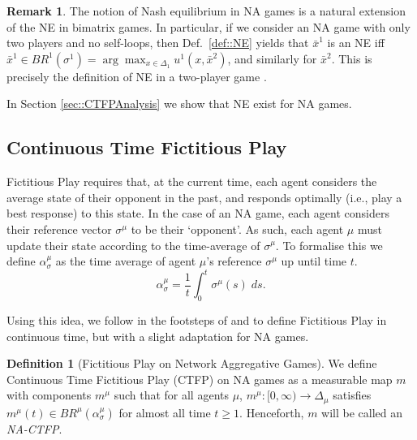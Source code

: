 \documentclass{article}
\theoremstyle{definition}
\newtheorem{definition}{Definition}
\newtheorem*{remark}{Remark}
\newcommand{\agentset}{\mathcal{N}}
\newcommand{\wmunu}{w^{\mu \nu}}
\newcommand{\xmu}{x^{\mu}}
\newcommand{\xnu}{x^{\nu}}
\newcommand{\refmu}{\sigma^{\mu}}
\newcommand{\avgref}[1]{\alpha_\sigma^{#1}}
\newcommand{\NE}[1]{\bar{x}^{#1}}
\newcommand{\weightedsum}{ \sum_{\nu \in N^\mu} \wmunu \xnu}
\begin{document}
\begin{remark}
	The notion of Nash equilibrium in NA games is a natural
	extension of the NE in bimatrix games.
	In particular, if we consider an NA game with only two players and no
	self-loops, then Def.~\ref{def::NE} yields that $ \NE{1}$ is an NE iff
	$     \NE{1} \in BR^1 (\sigma^1) = \arg \max_{x \in \Delta_1} u^1 (x, \NE{2})$,
	and similarly for $\NE{2}$. This is precisely the definition of NE in a two-player game \cite{}.
\end{remark}

In Section \ref{sec::CTFPAnalysis} we show that NE exist for NA games. 

%

\subsection{Continuous Time Fictitious Play}
\label{sec::CTFP}

  Fictitious Play requires that, at the current time, each agent
  considers the average state of their opponent in the past, and
  responds optimally (i.e., play a best response) to this state. In the
  case of an NA game, each agent considers their reference vector $\refmu$ to
  be their `opponent'. As such, each agent $\mu$ must update their state
  according to the time-average of $\refmu$. To formalise this we
  define $\avgref{\mu}$ as the time average of agent $\mu$'s reference
  $\refmu$ up until time $t$.
  \begin{equation*}
    \avgref{\mu} = \frac{1}{t} \int_0^t \refmu(s) \; ds.
  \end{equation*}

  Using this idea, we follow in the footsteps of  \cite{Ewerhart2020} and \cite{Harris1998} to define
  Fictitious Play in continuous time, but with a slight adaptation for NA games.
%
  \begin{definition}[Fictitious Play on Network Aggregative Games] \label{def::NACTFP}
    We define Continuous Time Fictitious Play (CTFP) on NA games as a measurable map $m$ with components $m^\mu$ such that for all agents $\mu$, $m^\mu: [0, \infty) \rightarrow \Delta_\mu$ satisfies $m^\mu(t) \in
    BR^\mu(\alpha_{\sigma}^\mu)$ for almost all time $t \geq 1$. Henceforth, $m$ will be called an \emph{NA-CTFP}.
  \end{definition}
\end{document}
